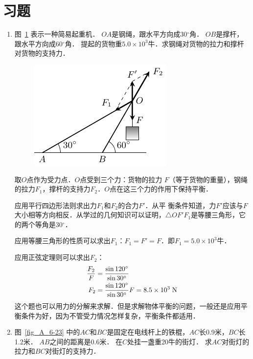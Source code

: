 \section*{习题}
\begin{enumerate}
    \item 图~\ref{fig_A_6-22} 表示一种简易起重机．
    $OA$是钢绳，跟水平方向成30$^\circ$角．
    $OB$是撑杆，跟水平方向成60$^\circ$角．
    提起的货物重$5.0\times 10^3$牛．求钢绳对货物的拉力和撑杆对货物的支持力．
\begin{figure}[htbp]
    \centering
    \includegraphics{fig/A/6-22.pdf}
    \caption{}\label{fig_A_6-22}
\end{figure}

\begin{solution}
取$O$点作为受力点．$O$点受到三个力：货物的拉力
$F$（等于货物的重量），钢绳的拉力$F_1$，撑杆的支持力$F_2$．$O$点在这三个力的作用下保持平衡．

应用平行四边形法则求出力$F_1$和$F_2$的合力$F'$．从平
衡条件知道，力$F'$应该与$F$大小相等方向相反．从学过的几何知识可以证明，$\triangle OF'F_1$是等腰三角形，它的两个等角是30$^\circ$．

应用等腰三角形的性质可以求出$F_1$：$F_1=F'=F$．即$F_1=5.0\times 10^3$牛．

应用正弦定理则可以求出$F_2$：
\[\begin{split}
\frac{F_2}{F}&=\frac{\sin 120^{\circ}}{\sin 30^{\circ}}\\
F_2&=\frac{\sin 120^{\circ}}{\sin 30^{\circ}}F=8.5\times 10^3 \;\text{N}
\end{split}\]
这个题也可以用力的分解来求解．但是求解物体平衡的问题，一般还是应用平衡条件为好，因为不管受力情况怎样复杂，平衡条件都适用．
\end{solution}

\item 图~\ref{fig_A_6-23} 中的$AC$和$BC$是固定在电线杆上的铁棍，$AC$长0.9米，$BC$长1.2米．
$AB$之间的距离是0.6米．
在$C$处挂一盏重20牛的街灯．
求$AC$对街灯的拉力和$BC$对街灯的支持力．


\end{enumerate}
